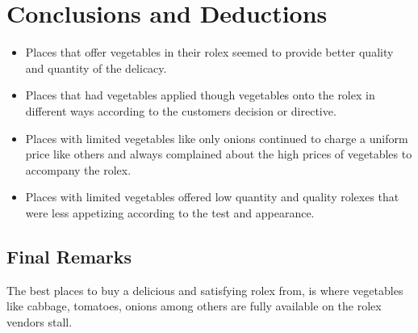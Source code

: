 \documentclass[12]{article}
\begin{document}
\section{Conclusions and Deductions}
\begin{itemize}
 \item Places that offer vegetables in their rolex seemed to provide better quality and quantity of the delicacy.
 \item Places that had vegetables applied though vegetables onto the rolex in different ways according to the customers decision or directive.
 \item Places with limited vegetables like only onions continued to charge a uniform price like others and always complained about the high prices of vegetables to accompany the rolex.
 \item Places with limited vegetables offered low quantity and quality rolexes that were less appetizing according to the test and appearance.
\end{itemize}
\subsection{Final Remarks}
The best places to buy a delicious and satisfying rolex from, is where vegetables like cabbage, tomatoes, onions among others are fully available on the rolex vendors stall.
\end{document}
